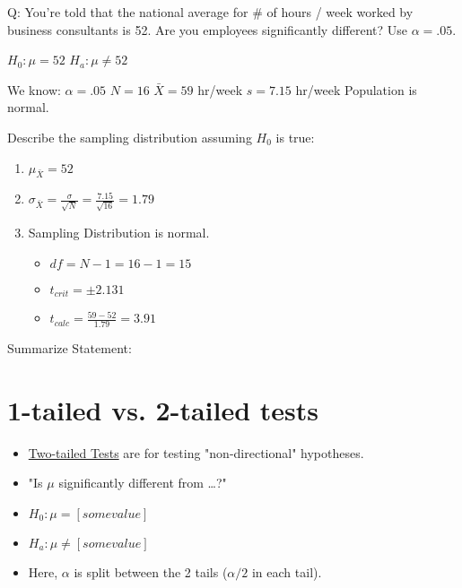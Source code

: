 \documentclass[11pt]{report}
\begin{document}
{
    Q: You're told that the national average for \# of hours / week worked by business consultants is 52. Are you employees significantly different? Use $\alpha = .05$. \newline

    $H_0: \mu = 52$ \newline
    $H_a: \mu \neq 52$ \newline

    We know: \newline
    $\alpha = .05$ \newline
    $N = 16$ \newline
    $\bar{X} = 59$ hr/week \newline
    $s = 7.15$ hr/week \newline 
    Population is normal. \newline

    Describe the sampling distribution assuming $H_0$ is true: \newline 
    \begin{enumerate}
        \item $\mu_{\bar{X}} = 52$ 
        \item $\sigma_{\bar{X}} = \frac{\sigma}{\sqrt{N}} = \frac{7.15}{\sqrt{16}} = 1.79$ 
        \item Sampling Distribution is normal. 
        \begin{itemize}
            \item $df = N - 1 = 16 -1 = 15$
            \item $t_{crit} = \pm 2.131$
            \item $t_{calc} = \frac{59 - 52}{1.79} = 3.91$
        \end{itemize}
    \end{enumerate}

    Summarize Statement: 
}

\section{1-tailed vs. 2-tailed tests}

\begin{multicols}{2}
    
\end{multicols}

\begin{itemize}
    \item \underline{Two-tailed Tests} are for testing "non-directional" hypotheses.
    \item "Is $\mu$ significantly different from \dots?"
    \item $H_0: \mu = [some value]$
    \item $H_a: \mu \neq [some value]$
    \item Here, $\alpha$ is split between the 2 tails ($\alpha/2$ in each tail).
\end{itemize}
\end{document}
